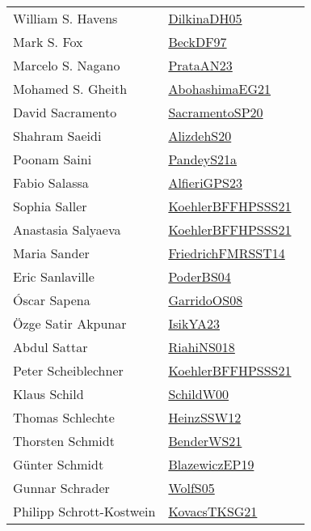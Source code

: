 {\begin{longtable}{p{4cm}p{20cm}}
William S. Havens & \href{works/DilkinaDH05.pdf}{DilkinaDH05}~\cite{DilkinaDH05}\\
Mark S. Fox & \href{works/BeckDF97.pdf}{BeckDF97}~\cite{BeckDF97}\\
Marcelo S. Nagano & \href{works/PrataAN23.pdf}{PrataAN23}~\cite{PrataAN23}\\
Mohamed S. Gheith & \href{works/AbohashimaEG21.pdf}{AbohashimaEG21}~\cite{AbohashimaEG21}\\
David Sacramento & \href{works/SacramentoSP20.pdf}{SacramentoSP20}~\cite{SacramentoSP20}\\
Shahram Saeidi & \href{}{AlizdehS20}~\cite{AlizdehS20}\\
Poonam Saini & \href{works/PandeyS21a.pdf}{PandeyS21a}~\cite{PandeyS21a}\\
Fabio Salassa & \href{works/AlfieriGPS23.pdf}{AlfieriGPS23}~\cite{AlfieriGPS23}\\
Sophia Saller & \href{works/KoehlerBFFHPSSS21.pdf}{KoehlerBFFHPSSS21}~\cite{KoehlerBFFHPSSS21}\\
Anastasia Salyaeva & \href{works/KoehlerBFFHPSSS21.pdf}{KoehlerBFFHPSSS21}~\cite{KoehlerBFFHPSSS21}\\
Maria Sander & \href{}{FriedrichFMRSST14}~\cite{FriedrichFMRSST14}\\
Eric Sanlaville & \href{works/PoderBS04.pdf}{PoderBS04}~\cite{PoderBS04}\\
{\'{O}}scar Sapena & \href{works/GarridoOS08.pdf}{GarridoOS08}~\cite{GarridoOS08}\\
{\"{O}}zge Satir Akpunar & \href{works/IsikYA23.pdf}{IsikYA23}~\cite{IsikYA23}\\
Abdul Sattar & \href{works/RiahiNS018.pdf}{RiahiNS018}~\cite{RiahiNS018}\\
Peter Scheiblechner & \href{works/KoehlerBFFHPSSS21.pdf}{KoehlerBFFHPSSS21}~\cite{KoehlerBFFHPSSS21}\\
Klaus Schild & \href{works/SchildW00.pdf}{SchildW00}~\cite{SchildW00}\\
Thomas Schlechte & \href{works/HeinzSSW12.pdf}{HeinzSSW12}~\cite{HeinzSSW12}\\
Thorsten Schmidt & \href{works/BenderWS21.pdf}{BenderWS21}~\cite{BenderWS21}\\
Günter Schmidt & \href{}{BlazewiczEP19}~\cite{BlazewiczEP19}\\
Gunnar Schrader & \href{works/WolfS05.pdf}{WolfS05}~\cite{WolfS05}\\
Philipp Schrott{-}Kostwein & \href{works/KovacsTKSG21.pdf}{KovacsTKSG21}~\cite{KovacsTKSG21}\\

\end{longtable}}
